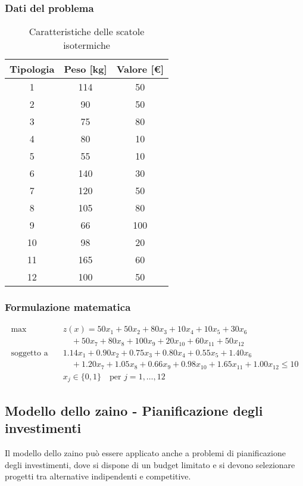 \subsubsection{Dati del problema}
\begin{table}[htbp]
    \centering
    \caption{Caratteristiche delle scatole isotermiche}
    \begin{tabular}{|c|c|c|}
        \hline
        \textbf{Tipologia} & \textbf{Peso [kg]} & \textbf{Valore [€]} \\
        \hline
        1 & 114 & 50 \\
        2 & 90 & 50 \\
        3 & 75 & 80 \\
        4 & 80 & 10 \\
        5 & 55 & 10 \\
        6 & 140 & 30 \\
        7 & 120 & 50 \\
        8 & 105 & 80 \\
        9 & 66 & 100 \\
        10 & 98 & 20 \\
        11 & 165 & 60 \\
        12 & 100 & 50 \\
        \hline
    \end{tabular}
\end{table}

\subsubsection{Formulazione matematica}

\[
\begin{aligned}
\max \quad & z(x) = 50x_1 + 50x_2 + 80x_3 + 10x_4 + 10x_5 + 30x_6 \\
& \quad + 50x_7 + 80x_8 + 100x_9 + 20x_{10} + 60x_{11} + 50x_{12} \\
\text{soggetto a} \quad & 1.14x_1 + 0.90x_2 + 0.75x_3 + 0.80x_4 + 0.55x_5 + 1.40x_6 \\
& \quad + 1.20x_7 + 1.05x_8 + 0.66x_9 + 0.98x_{10} + 1.65x_{11} + 1.00x_{12} \leq 10 \\
& x_j \in \{0, 1\} \quad \text{per } j = 1, \dots, 12
\end{aligned}
\]

\subsection{Modello dello zaino - Pianificazione degli investimenti}
Il modello dello zaino può essere applicato anche a problemi di 
pianificazione degli investimenti, dove si dispone di un budget limitato 
e si devono selezionare progetti tra alternative indipendenti e competitive.

